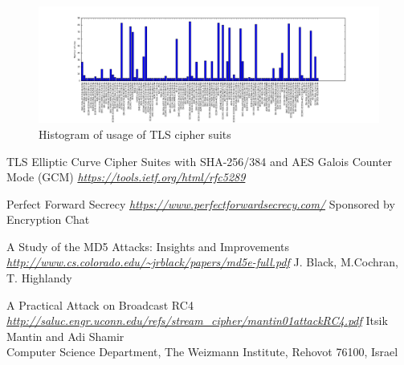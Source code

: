 \documentclass{article}
\begin{document}
\begin{figure}[h]
    \centering
    \includegraphics[width=\textwidth]{histogram-suits.png}
    \caption{Histogram of usage of TLS cipher suits}
    \label{fig:hist}
\end{figure}

\begin{thebibliography}{9}

  TLS Elliptic Curve Cipher Suites with SHA-256/384 and AES Galois Counter Mode (GCM)
  \emph{\url{https://tools.ietf.org/html/rfc5289}}
  
  Perfect Forward Secrecy
  \emph{\url{https://www.perfectforwardsecrecy.com/}}
  Sponsored by Encryption Chat

  A Study of the MD5 Attacks: Insights and Improvements
  \emph{\url{http://www.cs.colorado.edu/~jrblack/papers/md5e-full.pdf}}
  J. Black, M.Cochran, T. Highlandy
  
  A Practical Attack on Broadcast RC4
  \emph{\url{http://saluc.engr.uconn.edu/refs/stream_cipher/mantin01attackRC4.pdf}}
  Itsik Mantin and Adi Shamir\\
  Computer Science Department, The Weizmann Institute, Rehovot 76100, Israel
  
\end{thebibliography}
\end{document}
